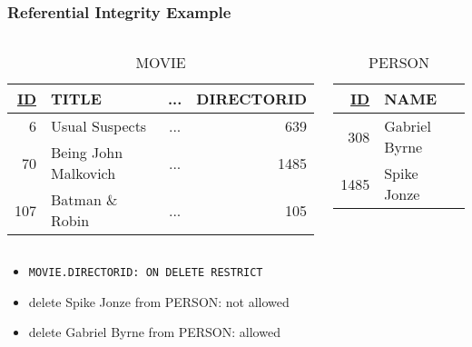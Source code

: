 \documentclass[dvipsnames]{beamer}
\theoremstyle{plain}
\begin{document}
\begin{frame}
  \frametitle{Referential Integrity Example}

  \begin{columns}
    \begin{tiny}
    \begin{table}
      \caption{MOVIE}
      \begin{tabular}{|r|l|c|r|}\hline
\underline{ID} & TITLE             & ... & DIRECTORID\\[2pt]\hline\hline
          6 & Usual Suspects       & ... &        639\\\hline
         70 & Being John Malkovich & ... &       1485\\\hline
        107 & Batman \& Robin      & ... &        105\\\hline
      \end{tabular}
    \end{table}
    \end{tiny}

    \begin{tiny}
    \begin{table}
      \caption{PERSON}
      \begin{tabular}{|r|l|}\hline
\underline{ID} & NAME\\[2pt]\hline\hline
           308 & Gabriel Byrne\\\hline
          1485 & Spike Jonze  \\\hline
      \end{tabular}
    \end{table}
    \end{tiny}
  \end{columns}

  \begin{itemize}
    \item \lstinline!MOVIE.DIRECTORID: ON DELETE RESTRICT!
    \smallskip
    \item delete Spike Jonze from PERSON: not allowed
    \item delete Gabriel Byrne from PERSON: allowed
  \end{itemize}
\end{frame}
\end{document}
